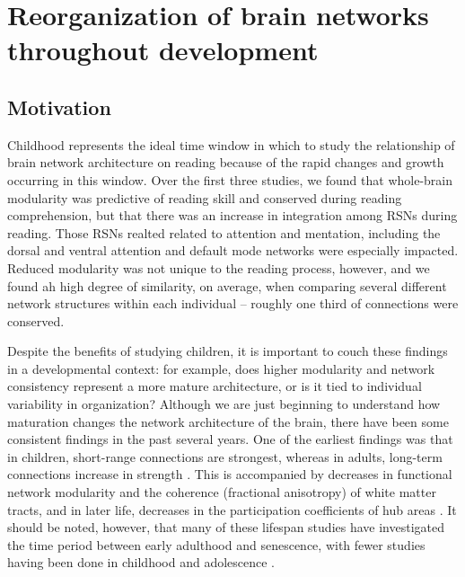 \chapter{Reorganization of brain networks throughout development}

\section{Motivation}

Childhood represents the ideal time window in which to study the relationship of brain network architecture on reading because of the rapid changes and growth occurring in this window. Over the first three studies, we found that whole-brain modularity was predictive of reading skill and conserved during reading comprehension, but that there was an increase in integration among RSNs during reading. Those RSNs realted related to attention and mentation, including the dorsal and ventral attention and default mode networks were especially impacted. Reduced modularity was not unique to the reading process, however, and we found ah high degree of similarity, on average, when comparing several different network structures within each individual -- roughly one third of connections were conserved. 

Despite the benefits of studying children, it is important to couch these findings in a developmental context: for example, does higher modularity and network consistency represent a more mature architecture, or is it tied to individual variability in organization? Although we are just beginning to understand how maturation changes the network architecture of the brain, there have been some consistent findings in the past several years. One of the earliest findings was that in children, short-range connections are strongest, whereas in adults, long-term connections increase in strength \citep{Power2010, Chan2014}. This is accompanied by decreases in functional network modularity and the coherence (fractional anisotropy) of white matter tracts, and in later life, decreases in the participation coefficients of hub areas \citep{Betzel2014}. It should be noted, however, that many of these lifespan studies have investigated the time period between early adulthood and senescence, with fewer studies having been done in childhood and adolescence \citep{Cao2016}.

